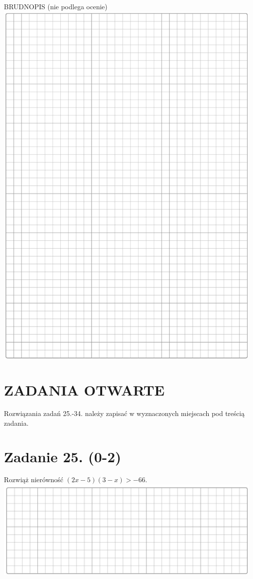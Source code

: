 \documentclass[10pt]{article}
\begin{document}
BRUDNOPIS (nie podlega ocenie)\\
\includegraphics[max width=\textwidth, center]{2024_11_21_724abc2cf5a71562f5b2g-09}

\section*{ZADANIA OTWARTE}
Rozwiązania zadań 25.-34. należy zapisać w wyznaczonych miejscach pod treścią zadania.

\section*{Zadanie 25. (0-2)}
Rozwiąż nierówność \((2 x-5)(3-x)>-66\).\\
\includegraphics[max width=\textwidth, center]{2024_11_21_724abc2cf5a71562f5b2g-10}
\end{document}
